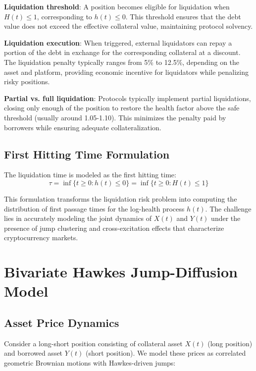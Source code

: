 \documentclass{article}
\theoremstyle{definition}
\begin{document}
\textbf{Liquidation threshold}: A position becomes eligible for liquidation when $H(t) \leq 1$, corresponding to $h(t) \leq 0$. This threshold ensures that the debt value does not exceed the effective collateral value, maintaining protocol solvency.

\textbf{Liquidation execution}: When triggered, external liquidators can repay a portion of the debt in exchange for the corresponding collateral at a discount. The liquidation penalty typically ranges from 5\% to 12.5\%, depending on the asset and platform, providing economic incentive for liquidators while penalizing risky positions.

\textbf{Partial vs. full liquidation}: Protocols typically implement partial liquidations, closing only enough of the position to restore the health factor above the safe threshold (usually around 1.05-1.10). This minimizes the penalty paid by borrowers while ensuring adequate collateralization.

\subsection{First Hitting Time Formulation}

The liquidation time is modeled as the first hitting time:
\begin{equation}
\tau = \inf\{t \geq 0 : h(t) \leq 0\} = \inf\{t \geq 0 : H(t) \leq 1\} \label{eq:liquidation_time}
\end{equation}

This formulation transforms the liquidation risk problem into computing the distribution of first passage times for the log-health process $h(t)$. The challenge lies in accurately modeling the joint dynamics of $X(t)$ and $Y(t)$ under the presence of jump clustering and cross-excitation effects that characterize cryptocurrency markets.

\section{Bivariate Hawkes Jump-Diffusion Model}

\subsection{Asset Price Dynamics}

Consider a long-short position consisting of collateral asset $X(t)$ (long position) and borrowed asset $Y(t)$ (short position). We model these prices as correlated geometric Brownian motions with Hawkes-driven jumps:
\end{document}
